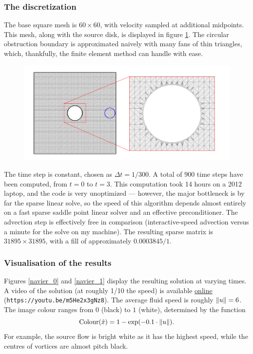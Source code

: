 \subsubsection{The discretization}
The base square mesh is $60 \times 60$, with velocity sampled at additional midpoints. This mesh, along with the source disk, is
displayed in figure \ref{navier_wireframe}. The circular obstruction boundary is approximated naively with many fans of thin triangles,
which, thankfully, the finite element method can handle with ease.

\begin{figure}[H]
    \centering
    \includegraphics[width=1\textwidth]{figures/navier_stokes/wireframe_full.png}
    \label{navier_wireframe}
\end{figure}

The time step is constant, chosen as $\Delta t = 1/300$. A total of $900$ time steps have been computed, from $t = 0$ to $t = 3$.
This computation took 14 hours on a 2012 laptop, and the code is very unoptimized --- however, the major bottleneck is by far the sparse linear solve,
so the speed of this algorithm depends almost entirely on a fast sparse saddle point linear solver and an effective preconditioner. The
advection step is effectively free in comparison (interactive-speed advection versus a minute for the solve on my machine). The resulting sparse matrix is $31895 \times 31895$, with a
fill of approximately $0.0003845/1$.

\subsubsection{Visualisation of the results}
Figures \ref{navier_0} and \ref{navier_1} display the resulting solution at varying times. A video of the solution (at roughly 1/10 the speed) is
available \href{https://youtu.be/m5He2x3gNz8}{online} (\texttt{https://youtu.be/m5He2x3gNz8}).
The average fluid speed is roughly $\norm{u} = 6$. The image colour ranges from $0$ (black) to $1$ (white),
determined by the function
    $$\text{Colour}(\hat{x}) = 1-\exp(-0.1\cdot \norm{u}).$$
For example, the source flow is bright white as it has the highest speed, while the centres of vortices are almost pitch black.

